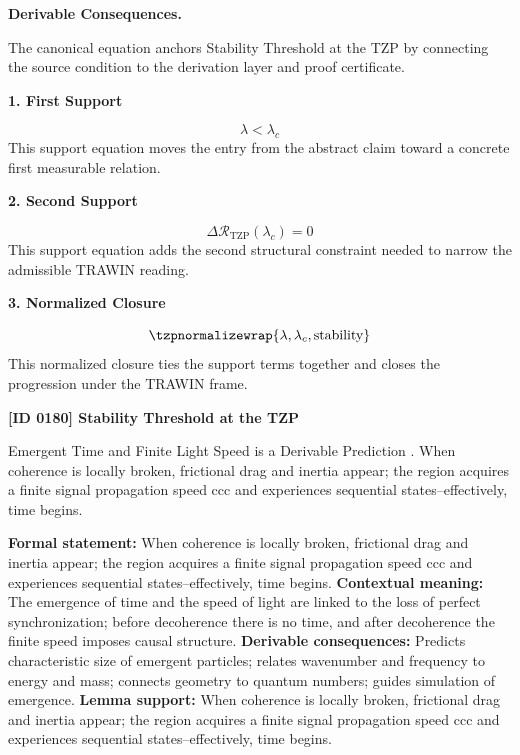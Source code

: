 \par\vspace{0.35em}
\noindent\textbf{Derivable Consequences.}\quad
\begingroup
\footnotesize
\raggedright
The canonical equation anchors Stability Threshold at the TZP by connecting the source condition to the derivation layer and proof certificate.
\par\endgroup

\noindent\textbf{1. First Support}\par
\[
\lambda < \lambda_c
\]
\noindent This support equation moves the entry from the abstract claim toward a concrete first measurable relation.\par
\noindent\textbf{2. Second Support}\par
\[
\Delta \mathcal{R}_{\mathrm{TZP}}(\lambda_c)=0
\]
\noindent This support equation adds the second structural constraint needed to narrow the admissible TRAWIN reading.\par
\noindent\textbf{3. Normalized Closure}\par
\[
\tzpnormalizewrap{\lambda,\lambda_c,\text{stability}}
\]
\noindent This normalized closure ties the support terms together and closes the progression under the TRAWIN frame.\par

\clearpage
\noindent\textbf{[ID 0180] Stability Threshold at the TZP}\par
\vspace{0.35em}
\begingroup\small
{}
Emergent Time and Finite Light Speed is a Derivable Prediction  . When coherence is locally broken, frictional drag and inertia appear; the region acquires a finite signal propagation speed ccc and experiences sequential states--effectively, time begins.

\begingroup\footnotesize\setlength{\emergencystretch}{3em}\sloppy
\textbf{Formal statement:} When coherence is locally broken, frictional drag and inertia appear; the region acquires a finite signal propagation speed ccc and experiences sequential states--effectively, time begins.
\textbf{Contextual meaning:} The emergence of time and the speed of light are linked to the loss of perfect synchronization; before decoherence there is no time, and after decoherence the finite speed imposes causal structure.  
\textbf{Derivable consequences:} Predicts characteristic size of emergent particles; relates wavenumber and frequency to energy and mass; connects geometry to quantum numbers; guides simulation of emergence.  
\textbf{Lemma support:} When coherence is locally broken, frictional drag and inertia appear; the region acquires a finite signal propagation speed ccc and experiences sequential states--effectively, time begins.\par
\endgroup

